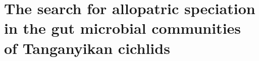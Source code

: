 
\chapter{The search for allopatric speciation in the gut microbial communities of Tanganyikan cichlids}


















